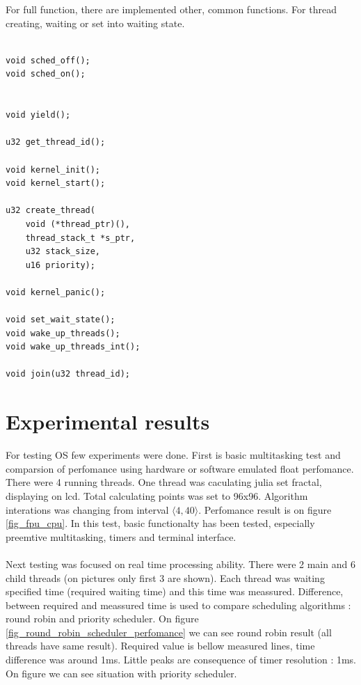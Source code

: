 \documentclass[conference]{IEEEtran}
\begin{document}
For full function, there are implemented other, common functions. For thread creating, waiting or set into waiting state.

\noindent\begin{minipage}{.45\textwidth}
\lstset{language=C++}    
\begin{lstlisting}[frame=single, caption = kernel functions]

void sched_off();
void sched_on();


void yield();

u32 get_thread_id();

void kernel_init();
void kernel_start();

u32 create_thread(
	void (*thread_ptr)(), 
	thread_stack_t *s_ptr, 
	u32 stack_size, 
	u16 priority);	

void kernel_panic();

void set_wait_state();
void wake_up_threads();
void wake_up_threads_int();

void join(u32 thread_id);

\end{lstlisting}
\end{minipage}\hfill



\section{Experimental results}

For testing OS few experiments were done. First is basic multitasking test and comparsion of perfomance using hardware or software emulated float perfomance.
There were 4 running threads. One thread was caculating julia set fractal, displaying on lcd. Total calculating points was set to 96x96.
Algorithm interations was changing from interval $\langle 4, 40 \rangle$. Perfomance result is on figure \ref{fig_fpu_cpu}. In this test, basic functionalty has been tested, especially preemtive multitasking, timers and terminal interface. \\
\\
Next testing was focused on real time processing ability. There were 2 main and 6 child threads (on pictures only first 3 are shown). Each thread was waiting specified time (required waiting time) and this time was meassured. Difference, between required and meassured time is used to compare scheduling algorithms : round robin and priority scheduler. On figure \ref{fig_round_robin_scheduler_perfomance} we can see round robin result (all threads have same result). Required value is bellow measured lines, time difference was around 1ms. Little peaks are consequence of timer resolution : 1ms.
On figure \label{fig_priority_scheduler_perfomance} we can see situation with priority scheduler. 
\end{document}
